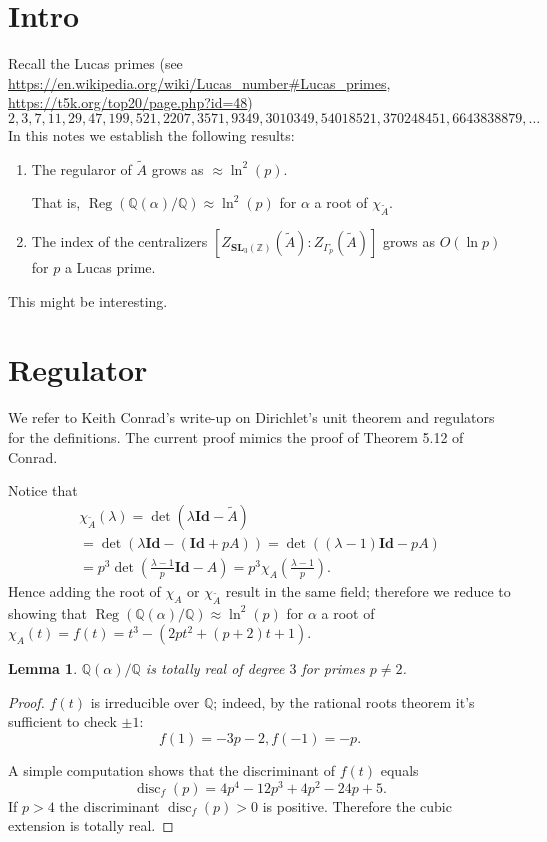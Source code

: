 \documentclass[a4paper]{article}
\newtheorem{Lem}[Thm]{Lemma}
\newcommand{\Q}{\mathbb{Q}}        %
\newcommand{\Id}{\mathbf{Id}}        %
\newcommand{\SL}{\mathbf{SL}_3(\mathbb{Z})}        %
\newcommand{\SLp}{\Gamma_p}        %
\DeclareMathOperator{\Reg}{Reg}        %
\DeclareMathOperator{\disc}{disc}        %
\begin{document}
\section{Intro}
Recall the Lucas primes (see \url{https://en.wikipedia.org/wiki/Lucas_number#Lucas_primes}, \url{https://t5k.org/top20/page.php?id=48})
\begin{equation}
	\label{the_primes_sequence}
2, 3, 7, 11, 29, 47, 199, 521, 2207, 3571, 9349, 3010349, 54018521, 370248451, 6643838879, \ldots
\end{equation}
In this notes we establish the following results:
\begin{enumerate}
\item
The regularor of $\tilde A$
grows as $\approx \ln^2(p)$. 

That is, $\Reg ( \Q(\alpha)/\Q ) \approx \ln^2(p) $ for $\alpha$ a root of $\chi_{\tilde A}$.

\item
The index of the centralizers
$ [Z_{\SL}(\tilde A) : Z_{\SLp}(\tilde A)] $
grows as $O(\ln p)$ for $p$ a Lucas prime.
\end{enumerate}
This might be interesting.
\section{Regulator}
We refer to Keith Conrad's write-up on Dirichlet's unit theorem and regulators \cite{conraddirichlet} for the definitions.
The current proof mimics the proof of Theorem 5.12 of Conrad.

Notice that 
\begin{multline}
\chi_{\tilde A}(\lambda) 
= \det(\lambda \Id - \tilde A) \\
= \det(\lambda \Id - (\Id + p A))
= \det((\lambda - 1) \Id - p A)\\
= p^3 \det(\frac{\lambda - 1}p \Id - A)
= p^3 \chi_A(\frac{\lambda - 1}p)
.\end{multline}
Hence adding the root of $\chi_{A}$ or $\chi_{\tilde A}$ result in the same field; therefore we reduce to showing that 
$\Reg ( \Q(\alpha)/\Q ) \approx \ln^2(p) $ for $\alpha$ a root of $\chi_{A}(t) = f(t) = t^3 - (2p t^2 + (p + 2) t + 1) $.

\begin{Lem}
$\Q(\alpha)/\Q$ is totally real of degree $3$ for primes $p \ne 2$.
\end{Lem}
\begin{proof}
$f(t)$ is irreducible over $\Q$; indeed, by the rational roots theorem it's sufficient to check $\pm 1$:
$$f(1) = - 3 p - 2, f(-1) = - p .$$

A simple computation shows that the discriminant of $f(t)$ equals 
\[
	\disc_f(p) = 4 p^4 - 12 p^3 + 4 p^2 - 24 p + 5
.\]
If $p > 4$ the discriminant  $\disc_f(p) > 0$ is positive.
Therefore the cubic extension is totally real.
\end{proof}
\end{document}
